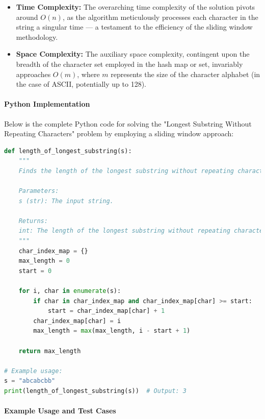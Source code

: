 \begin{itemize}
	\item \textbf{Time Complexity:} The overarching time complexity of the solution pivots around \(O(n)\), as the algorithm meticulously processes each character in the string a singular time — a testament to the efficiency of the sliding window methodology.
	\item \textbf{Space Complexity:} The auxiliary space complexity, contingent upon the breadth of the character set employed in the hash map or set, invariably approaches \(O(m)\), where \(m\) represents the size of the character alphabet (in the case of ASCII, potentially up to 128).
\end{itemize}

\paragraph*{Python Implementation}

Below is the complete Python code for solving the "Longest Substring Without Repeating Characters" problem by employing a sliding window approach:

\begin{fullwidth}
\begin{lstlisting}[language=Python]
def length_of_longest_substring(s):
    """
    Finds the length of the longest substring without repeating characters.
    
    Parameters:
    s (str): The input string.
    
    Returns:
    int: The length of the longest substring without repeating characters.
    """
    char_index_map = {}
    max_length = 0
    start = 0
    
    for i, char in enumerate(s):
        if char in char_index_map and char_index_map[char] >= start:
            start = char_index_map[char] + 1
        char_index_map[char] = i
        max_length = max(max_length, i - start + 1)
    
    return max_length

# Example usage:
s = "abcabcbb"
print(length_of_longest_substring(s))  # Output: 3
\end{lstlisting}
\end{fullwidth}

\paragraph*{Example Usage and Test Cases}

